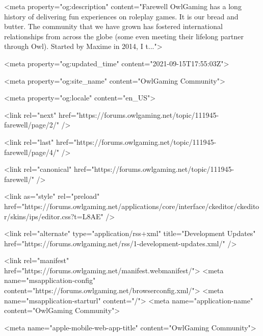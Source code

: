 		
	

	
		
			
				<meta property="og:description" content="Farewell OwlGaming has a long history of delivering fun experiences on roleplay games. It is our bread and butter. The community that we have grown has fostered international relationships from across the globe (some even meeting their lifelong partner through Owl). Started by Maxime in 2014, I t...">
			
		
	

	
		
			
				<meta property="og:updated_time" content="2021-09-15T17:55:03Z">
			
		
	

	
		
			
				<meta property="og:site_name" content="OwlGaming Community">
			
		
	

	
		
			
				<meta property="og:locale" content="en_US">
			
		
	


	
		<link rel="next" href="https://forums.owlgaming.net/topic/111945-farewell/page/2/" />
	

	
		<link rel="last" href="https://forums.owlgaming.net/topic/111945-farewell/page/4/" />
	

	
		<link rel="canonical" href="https://forums.owlgaming.net/topic/111945-farewell/" />
	

	
		<link as="style" rel="preload" href="https://forums.owlgaming.net/applications/core/interface/ckeditor/ckeditor/skins/ips/editor.css?t=L8AE" />
	

<link rel="alternate" type="application/rss+xml" title="Development Updates" href="https://forums.owlgaming.net/rss/1-development-updates.xml/" />


<link rel="manifest" href="https://forums.owlgaming.net/manifest.webmanifest/">
<meta name="msapplication-config" content="https://forums.owlgaming.net/browserconfig.xml/">
<meta name="msapplication-starturl" content="/">
<meta name="application-name" content="OwlGaming Community">

<meta name="apple-mobile-web-app-title" content="OwlGaming Community">


